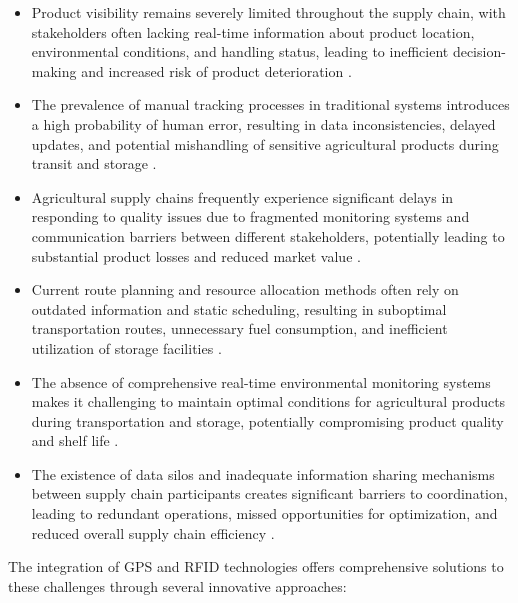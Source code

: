 \documentclass[conference]{IEEEtran}
\begin{document}
\begin{itemize}
    \item Product visibility remains severely limited throughout the supply chain, with stakeholders often lacking real-time information about product location, environmental conditions, and handling status, leading to inefficient decision-making and increased risk of product deterioration \cite{makario2021bluetooth}.
    
    \item The prevalence of manual tracking processes in traditional systems introduces a high probability of human error, resulting in data inconsistencies, delayed updates, and potential mishandling of sensitive agricultural products during transit and storage \cite{rosero2023smart}.
    
    \item Agricultural supply chains frequently experience significant delays in responding to quality issues due to fragmented monitoring systems and communication barriers between different stakeholders, potentially leading to substantial product losses and reduced market value \cite{al2021prochain}.
    
    \item Current route planning and resource allocation methods often rely on outdated information and static scheduling, resulting in suboptimal transportation routes, unnecessary fuel consumption, and inefficient utilization of storage facilities \cite{tharatipyakul2021user}.
    
    \item The absence of comprehensive real-time environmental monitoring systems makes it challenging to maintain optimal conditions for agricultural products during transportation and storage, potentially compromising product quality and shelf life \cite{hernandez2024implementation}.
    
    \item The existence of data silos and inadequate information sharing mechanisms between supply chain participants creates significant barriers to coordination, leading to redundant operations, missed opportunities for optimization, and reduced overall supply chain efficiency \cite{visconti2020development}.
\end{itemize}

The integration of GPS and RFID technologies offers comprehensive solutions to these challenges through several innovative approaches:
\end{document}
